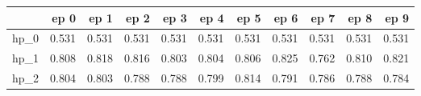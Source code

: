 \begin{tabular}{lrrrrrrrrrr}
\toprule
{} &   ep 0 &   ep 1 &   ep 2 &   ep 3 &   ep 4 &   ep 5 &   ep 6 &   ep 7 &   ep 8 &   ep 9 \\
\midrule
hp\_0 &  0.531 &  0.531 &  0.531 &  0.531 &  0.531 &  0.531 &  0.531 &  0.531 &  0.531 &  0.531 \\
hp\_1 &  0.808 &  0.818 &  0.816 &  0.803 &  0.804 &  0.806 &  0.825 &  0.762 &  0.810 &  0.821 \\
hp\_2 &  0.804 &  0.803 &  0.788 &  0.788 &  0.799 &  0.814 &  0.791 &  0.786 &  0.788 &  0.784 \\
\bottomrule
\end{tabular}
